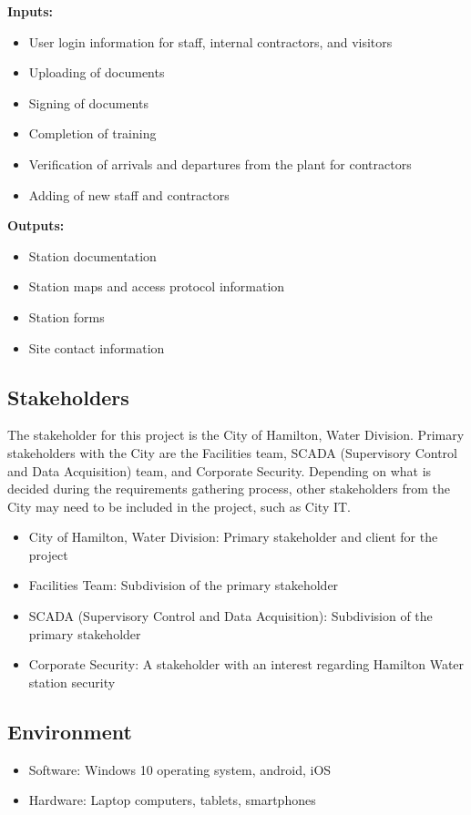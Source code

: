 \documentclass{article}
\begin{document}
\textbf{Inputs:}
\begin{itemize}
\item User login information for staff, internal contractors, and visitors
\item Uploading of documents
\item Signing of documents
\item Completion of training
\item Verification of arrivals and departures from the plant for contractors
\item Adding of new staff and contractors
\end{itemize}
\textbf{Outputs:}
\begin{itemize}
\item Station documentation
\item Station maps and access protocol information
\item Station forms
\item Site contact information
\end{itemize}

\subsection{Stakeholders}
The stakeholder for this project is the City of Hamilton, Water Division. Primary stakeholders with the City are
the Facilities team, SCADA (Supervisory Control and Data Acquisition) team, and Corporate Security.
Depending on what is decided during the requirements gathering process, other stakeholders from the City
may need to be included in the project, such as City IT.
\begin{itemize}
\item City of Hamilton, Water Division: Primary stakeholder and client for the project
\item Facilities Team: Subdivision of the primary stakeholder
\item SCADA (Supervisory Control and Data Acquisition): Subdivision of the primary stakeholder
\item Corporate Security: A stakeholder with an interest regarding Hamilton Water station security
\end{itemize}
\subsection{Environment}
\begin{itemize}
\item Software: Windows 10 operating system, android, iOS
\item Hardware: Laptop computers, tablets, smartphones
\end{itemize}
\end{document}
